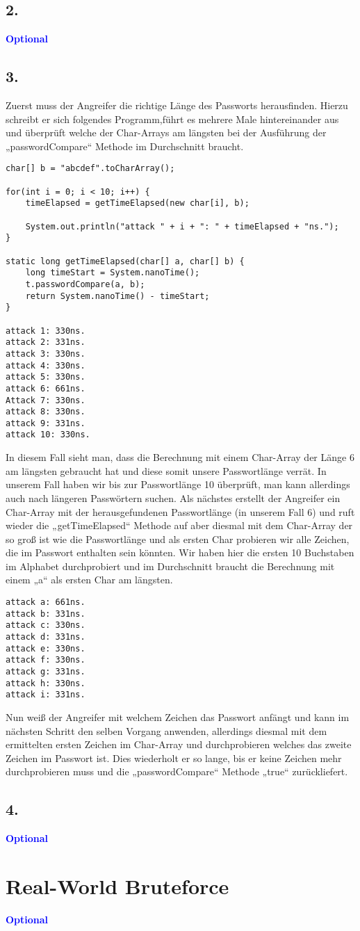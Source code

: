 \documentclass[a4paper,11pt]{scrartcl}
\newcommand{\opt}{\textcolor{blue}{\textbf{Optional}}}
\begin{document}
\subsection*{2.} \opt
\subsection*{3.}
Zuerst muss der Angreifer die richtige Länge des Passworts herausfinden. Hierzu schreibt er sich folgendes Programm,führt es mehrere Male hintereinander aus und überprüft welche der Char-Arrays am längsten bei der Ausführung der „passwordCompare“ Methode im Durchschnitt braucht.

\begin{verbatim}
char[] b = "abcdef".toCharArray();

for(int i = 0; i < 10; i++) {
	timeElapsed = getTimeElapsed(new char[i], b);
			
	System.out.println("attack " + i + ": " + timeElapsed + "ns.");
}

static long getTimeElapsed(char[] a, char[] b) {
	long timeStart = System.nanoTime();
	t.passwordCompare(a, b);
	return System.nanoTime() - timeStart;
}

attack 1: 330ns.
attack 2: 331ns.
attack 3: 330ns.
attack 4: 330ns.
attack 5: 330ns.
attack 6: 661ns.
Attack 7: 330ns.
attack 8: 330ns.
attack 9: 331ns.
attack 10: 330ns.
\end{verbatim}

In diesem Fall sieht man, dass die Berechnung mit einem Char-Array der Länge 6 am längsten gebraucht hat und diese somit unsere Passwortlänge verrät. In unserem Fall haben wir bis zur Passwortlänge 10 überprüft, man kann allerdings auch nach längeren Passwörtern suchen.
Als nächstes erstellt der Angreifer ein Char-Array mit der herausgefundenen Passwortlänge (in unserem Fall 6) und ruft wieder die „getTimeElapsed“ Methode auf aber diesmal mit dem Char-Array der so groß ist wie die Passwortlänge und als ersten Char probieren wir alle Zeichen, die im Passwort enthalten sein könnten. Wir haben hier die ersten 10 Buchstaben im Alphabet durchprobiert und im Durchschnitt braucht die Berechnung mit einem „a“ als ersten Char am längsten.

\begin{verbatim}
attack a: 661ns.
attack b: 331ns.
attack c: 330ns.
attack d: 331ns.
attack e: 330ns.
attack f: 330ns.
attack g: 331ns.
attack h: 330ns.
attack i: 331ns.
\end{verbatim}

Nun weiß der Angreifer mit welchem Zeichen das Passwort anfängt und kann im nächsten Schritt den selben Vorgang anwenden, allerdings diesmal mit dem ermittelten ersten Zeichen im Char-Array und durchprobieren welches das zweite Zeichen im Passwort ist. Dies wiederholt er so lange, bis er keine Zeichen mehr durchprobieren muss und die „passwordCompare“ Methode „true“ zurückliefert.

\subsection*{4.} \opt

\section{\textbf{Real-World Bruteforce}}
\opt
\end{document}
